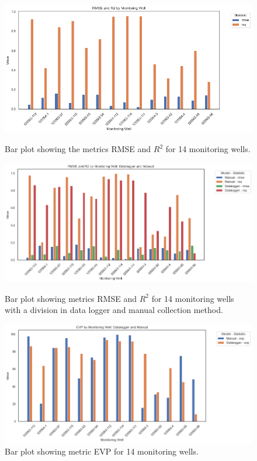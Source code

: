 \begin{figure}[htbp]
    \centering
    \begin{minipage}{0.48\textwidth}
        \centering
        \includegraphics[width=\linewidth]{frontmatter/Heijplaat-fig/rmr2heij.png}
        \caption{Bar plot showing the metrics RMSE and $R^2$ for 14 monitoring wells.}
        \label{bar1heij}
    \end{minipage}\hfill
    \begin{minipage}{0.48\textwidth}
        \centering
        \includegraphics[width=\linewidth]{frontmatter/Heijplaat-fig/rmser2heij.png}
        \caption{Bar plot showing metrics RMSE and $R^2$ for 14 monitoring wells with a division in data logger and manual collection method.}
        \label{bar2heij}
    \end{minipage}\hfill
    \begin{minipage}{0.48\textwidth}
        \centering
        \includegraphics[width=\linewidth]{frontmatter/Heijplaat-fig/evpheij.png}
        \caption{Bar plot showing metric EVP for 14 monitoring wells.}   
        \label{barevpheij}
    \end{minipage}
\end{figure}
